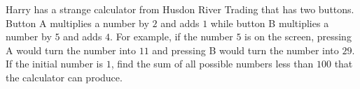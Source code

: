 Harry has a strange calculator from Husdon River Trading that has two buttons. Button A multiplies a number by $2$ and adds $1$ while button B multiplies a number by $5$ and adds $4$. For example, if the number $5$ is on the screen, pressing A would turn the number into $11$ and pressing B would turn the number into $29$. If the initial number is $1$, find the sum of all possible numbers less than $100$ that the calculator can produce.
